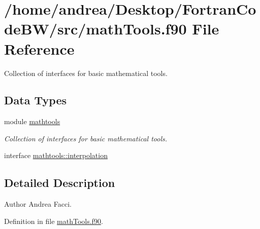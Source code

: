 \hypertarget{math_tools_8f90}{\section{/home/andrea/\-Desktop/\-Fortran\-Code\-B\-W/src/math\-Tools.f90 File Reference}
\label{math_tools_8f90}
}


Collection of interfaces for basic mathematical tools.  


\subsection*{Data Types}
\begin{DoxyCompactItemize}
\item 
module \hyperlink{classmathtools}{mathtools}
\begin{DoxyCompactList}\small\item\em Collection of interfaces for basic mathematical tools. \end{DoxyCompactList}\item 
interface \hyperlink{interfacemathtools_1_1interpolation}{mathtools\-::interpolation}
\end{DoxyCompactItemize}


\subsection{Detailed Description}
\begin{DoxyAuthor}{Author}
Andrea Facci. 
\end{DoxyAuthor}


Definition in file \hyperlink{math_tools_8f90_source}{math\-Tools.\-f90}.

